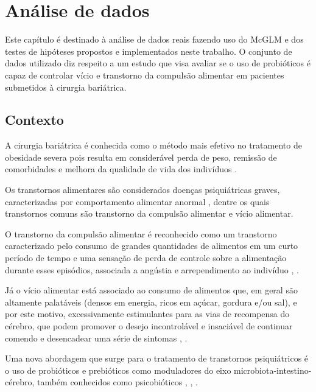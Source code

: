 
\chapter{Análise de dados}\label{cap:aplicacao}


Este capítulo é destinado à análise de dados reais fazendo uso do McGLM e dos testes de hipóteses propostos e implementados neste trabalho. O conjunto de dados utilizado diz respeito a um estudo que visa avaliar se o uso de probióticos é capaz de controlar vício e transtorno da compulsão alimentar em pacientes submetidos à cirurgia bariátrica.


\section{Contexto}

A cirurgia bariátrica é conhecida como o método mais efetivo no tratamento de obesidade severa pois resulta em considerável perda de peso, remissão de comorbidades e melhora da qualidade de vida dos indivíduos \citep{mechanick2020clinical}.

Os transtornos alimentares são considerados doenças psiquiátricas graves, caracterizadas por comportamento alimentar anormal \citep{treasure2020eating}, dentre os quais transtornos comuns são transtorno da compulsão alimentar e vício alimentar.

O transtorno da compulsão alimentar é reconhecido como um transtorno caracterizado pelo consumo de grandes quantidades de alimentos em um curto período de tempo e uma sensação de perda de controle sobre a alimentação durante esses episódios, associada a angústia e arrependimento ao indivíduo \citep{sarmiento2020diagnostic}, \citep{wilfley2016characteristics}.

Já o vício alimentar está associado ao consumo de alimentos que, em geral são altamente palatáveis (densos em energia, ricos em açúcar, gordura e/ou sal), e por este motivo, excessivamente estimulantes para as vias de recompensa do cérebro, que podem promover o desejo incontrolável e insaciável de continuar comendo e desencadear uma série de sintomas \citep{avena2012further}, \citep{najem2020prevalence}.

Uma nova abordagem que surge para o tratamento de transtornos psiquiátricos é o uso de probióticos e prebióticos como moduladores do eixo microbiota-intestino-cérebro, também conhecidos como psicobióticos \citep{dinan2013psychobiotics}, \citep{mason2017feeding}, \citep{misra2019psychobiotics}.

